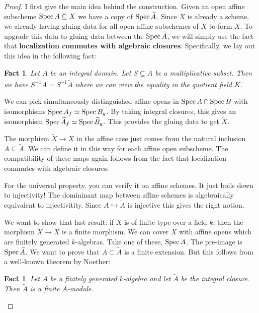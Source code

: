 \documentclass[]{pcmi}
\theoremstyle{plain}
\newtheorem{Fact}[equation]{Fact}
\theoremstyle{definition}
\theoremstyle{remark}
\begin{document}
\begin{proof}
    I first give the main idea behind the construction. Given an open affine subscheme $\operatorname{Spec} A \subseteq X$ we have a copy of $\operatorname{Spec} \widetilde{A}$. Since $X$ is already a scheme, we already having gluing data for all open affine subschemes of $X$ to form $X$. To upgrade this data to gluing data between the $\operatorname{Spec} \widetilde{A}$, we will simply use the fact that \textbf{localization commutes with algebraic closures}. Specifically, we lay out this idea in the following fact: 

    \begin{Fact}
        Let $A$ be an integral domain. Let $S \subseteq A$ be a multiplicative subset. Then we have $\widetilde{S^{-1}A} = S^{-1} \widetilde{A}$ where we can view the equality in the quotient field $K$.  
    \end{Fact}

    We can pick simultaneously distinguished affine opens in $\operatorname{Spec} A \cap \operatorname{Spec} B$ with isomorphisms $\operatorname{Spec} A_f \simeq \operatorname{Spec} B_g$. By taking integral closures, this gives an isomorphism $\operatorname{Spec} \widetilde{A}_f \simeq \operatorname{Spec} \widetilde{B}_g$. This provides the gluing data to get $\widetilde{X}$. 

    The morphism $\widetilde{X} \to X$ in the affine case just comes from the natural inclusion $A \subseteq \widetilde{A}$. We can define it in this way for each affine open subscheme. The compatibility of these maps again follows from the fact that localization commutes with algebraic closures. 

    For the universal property, you can verify it on affine schemes. It just boils down to injectivity! The domininant map between affine schemes is algebraically equivalent to injectivitity. Since $A \hookrightarrow \widetilde{A}$ is injective this gives the right notion. 

    We want to show that last result: if $X$ is of finite type over a field $k$, then the morphism $\widetilde{X} \to X$ is a finite morphism. We can cover $X$ with affine opens which are finitely generated $k$-algebras. Take one of these, $\operatorname{Spec} A$. The pre-image is $\operatorname{Spec} \widetilde{A}$. We want to prove that $A \subset \widetilde{A}$ is a finite extension. But this follows from a well-known theorem by Noether: 
    \begin{Fact}
        Let $A$ be a finitely generated $k$-algebra and let $\widetilde{A}$ be the integral closure. Then $\widetilde{A}$ is a finite $A$-module. 
    \end{Fact} 
\end{proof}
\end{document}
